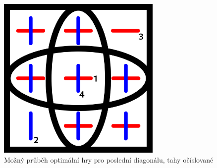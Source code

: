 \begin{figure}[h]
    \centering
    \includegraphics[width=300px]{img/last-diagonal.png}
    \caption{Možný průběh optimální hry pro poslední diagonálu, tahy očíslované}
    \label{fig:last-diagonal}
\end{figure}
